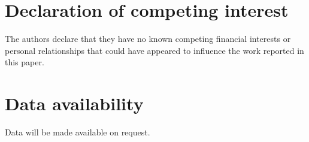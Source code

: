 \documentclass[a4paper,fleqn]{cas-sc}
\begin{document}
\maketitle






\section*{Declaration of competing interest}
The authors declare that they have no known competing financial interests or
personal relationships that could have appeared to influence the work reported
in this paper.

\section*{Data availability}
Data will be made available on request.


\printcredits



\end{document}
